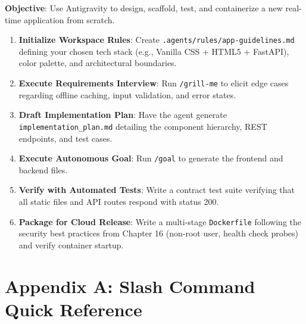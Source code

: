 \documentclass[11pt,a4paper,oneside]{book}
\begin{document}
\begin{labbox}
\textbf{Objective}: Use Antigravity to design, scaffold, test, and containerize a new real-time application from scratch.

\begin{enumerate}
    \item \textbf{Initialize Workspace Rules}: Create \texttt{.agents/rules/app-guidelines.md} defining your chosen tech stack (e.g., Vanilla CSS + HTML5 + FastAPI), color palette, and architectural boundaries.
    \item \textbf{Execute Requirements Interview}: Run \texttt{/grill-me} to elicit edge cases regarding offline caching, input validation, and error states.
    \item \textbf{Draft Implementation Plan}: Have the agent generate \texttt{implementation\_plan.md} detailing the component hierarchy, REST endpoints, and test cases.
    \item \textbf{Execute Autonomous Goal}: Run \texttt{/goal} to generate the frontend and backend files.
    \item \textbf{Verify with Automated Tests}: Write a contract test suite verifying that all static files and API routes respond with status 200.
    \item \textbf{Package for Cloud Release}: Write a multi-stage \texttt{Dockerfile} following the security best practices from Chapter 16 (non-root user, health check probes) and verify container startup.
\end{enumerate}
\end{labbox}

\backmatter

\chapter{Appendix A: Slash Command Quick Reference}
\end{document}
